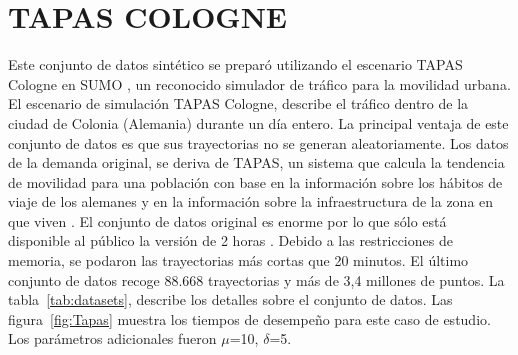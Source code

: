 \section{TAPAS COLOGNE}

Este conjunto de datos sintético se preparó utilizando el escenario TAPAS 
Cologne \cite{varschen2006mikroskopische}
en SUMO \cite{krajzewicz2002sumo}, un reconocido simulador de tráfico para la 
movilidad urbana. El escenario de simulación 
TAPAS Cologne, describe el tráfico dentro de la ciudad de Colonia (Alemania) 
durante un día entero. La principal ventaja de 
este conjunto de datos es que sus trayectorias no se generan aleatoriamente. Los 
datos de la demanda original, se deriva de TAPAS, 
un sistema que calcula la tendencia de movilidad para una población con base en 
la información sobre los hábitos de viaje 
de los alemanes y en la información sobre la infraestructura de la zona en que 
viven \cite{MiD2002}. El conjunto de datos original 
es enorme por lo que sólo está disponible al público la versión de 2 horas 
\cite{TAPASCologne}. Debido a las restricciones de memoria,
se podaron las trayectorias más cortas que 20 minutos. El último conjunto de 
datos recoge 88.668 trayectorias y más 
de 3,4 millones de puntos. La tabla~\ref{tab:datasets}, describe los detalles 
sobre el conjunto de datos. Las figura~\ref{fig:Tapas} muestra los tiempos de 
desempeño para este caso de estudio. Los parámetros adicionales fueron $\mu$=10, 
$\delta$=5.

